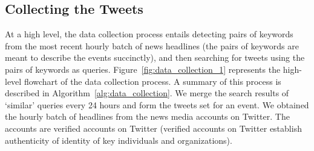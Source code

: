 \documentclass[10pt,letterpaper]{article}
\begin{document}
\subsection{Collecting the Tweets}
\label{sec:collecting_the_data}
At a high level, the data collection process entails detecting pairs
of keywords from the most recent hourly batch of news headlines (the
pairs of keywords are meant to describe the events succinctly), and
then searching for tweets using the pairs of keywords as queries.
Figure~\ref{fig:data_collection_1} represents the high-level flowchart
of the data collection process. A summary of this process is described
in Algorithm~\ref{alg:data_collection}. We merge the search results of
`similar' queries every 24 hours and form the tweets set for an event.
We obtained the hourly batch of headlines from the news media accounts
on Twitter. The accounts are verified accounts on
Twitter (verified accounts on Twitter establish authenticity
  of identity of key individuals and organizations).
\end{document}

